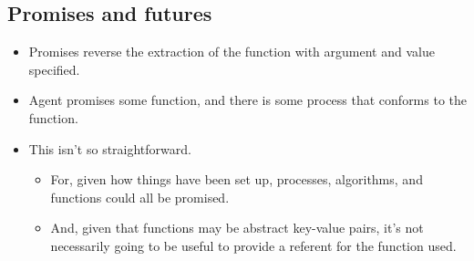 \documentclass[10pt]{article}
\newcommand{\hozline}[0]{%
  \noindent\hdashrule[0.5ex][c]{\textwidth}{.1pt}{}
}
\begin{document}
\hozline


\subsection{Promises and futures}
\label{sec:promises-futures}

\begin{itemize}
\item Promises reverse the extraction of the function with argument and value specified.
\item Agent promises some function, and there is some process that conforms to the function.
\item This isn't so straightforward.
  \begin{itemize}
  \item For, given how things have been set up, processes, algorithms, and functions could all be promised.
  \item And, given that functions may be abstract key-value pairs, it's not necessarily going to be useful to provide a referent for the function used.
  \end{itemize}
\end{itemize}
\end{document}
